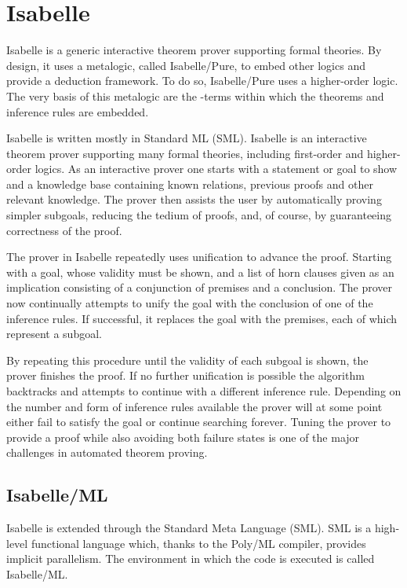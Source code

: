 \section{Isabelle}
Isabelle is a generic interactive theorem prover supporting formal theories. By design, it uses a metalogic, called Isabelle/Pure, to embed other logics and provide a deduction framework. To do so, Isabelle/Pure uses a higher-order logic. The very basis of this metalogic are the \lam -terms within which the theorems and inference rules are embedded.

Isabelle is written mostly in Standard ML (SML).
Isabelle is an interactive theorem prover supporting many formal theories, including first-order and higher-order logics. As an interactive prover one starts with a statement or goal to show and a knowledge base containing known relations, previous proofs and other relevant knowledge. The prover then assists the user by automatically proving simpler subgoals, reducing the tedium of proofs, and, of course, by guaranteeing correctness of the proof.

The prover in Isabelle repeatedly uses unification to advance the proof. Starting with a goal, whose validity must be shown, and a list of horn clauses given as an implication consisting of a conjunction of premises and a conclusion. The prover now continually attempts to unify the goal with the conclusion of one of the inference rules. If successful, it replaces the goal with the premises, each of which represent a subgoal.

By repeating this procedure until the validity of each subgoal is shown, the prover finishes the proof. If no further unification is possible the algorithm backtracks and attempts to continue with a different inference rule. Depending on the number and form of inference rules available the prover will at some point either fail to satisfy the goal or continue searching forever. Tuning the prover to provide a proof while also avoiding both failure states is one of the major challenges in automated theorem proving. \cite{paulson_isabelle_nodate}

\subsection{Isabelle/ML}
Isabelle is extended through the Standard Meta Language (SML). SML is a high-level functional language which, thanks to the Poly/ML compiler, provides implicit parallelism. The environment in which the code is executed is called Isabelle/ML.


